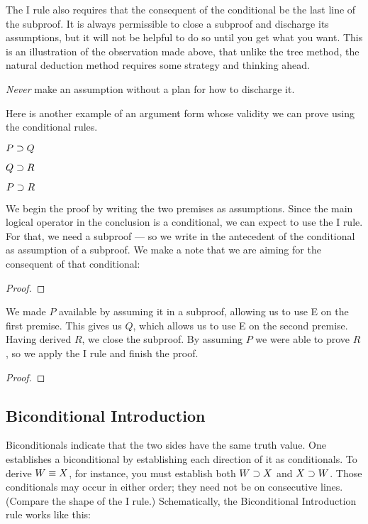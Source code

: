 The {\eif}I rule also requires that the consequent of the conditional be the last line of the subproof. It is always permissible to close a subproof and discharge its assumptions, but it will not be helpful to do so until you get what you want. This is an illustration of the observation made above, that unlike the tree method, the natural deduction method requires some strategy and thinking ahead.

\emph{Never} make an assumption without a plan for how to discharge it.

Here is another example of an argument form whose validity we can prove using the conditional rules.

\label{HSproof}
\begin{earg}
\item[] $P \supset Q$
\item[] $Q \supset R$
\item[\therefore] $P \supset R$
\end{earg}
We begin the proof by writing the two premises as assumptions. Since the main logical operator in the conclusion is a conditional, we can expect to use the {\eif}I rule. For that, we need a subproof --- so we write in the antecedent of the conditional as assumption of a subproof. We make a note that we are aiming for the consequent of that conditional:

\begin{proof}
	\open
		 
	\close
\end{proof}

We made $P$ available by assuming it in a subproof, allowing us to use {\eif}E on the first premise. This gives us $Q$, which allows us to use {\eif}E on the second premise. Having derived $R$, we close the subproof. By assuming $P$ we were able to prove $R$, so we apply the {\eif}I rule and finish the proof.

\begin{proof}
	\open
	\close
\end{proof}




\subsection{Biconditional Introduction}
Biconditionals indicate that the two sides have the same truth value. One establishes a biconditional by establishing each direction of it as conditionals. To derive $W \equiv X$, for instance, you must establish both $W \supset X$ and $X \supset W$. Those conditionals may occur in either order; they need not be on consecutive lines. (Compare the shape of the {\eand}I rule.) Schematically, the Biconditional Introduction rule works like this:

